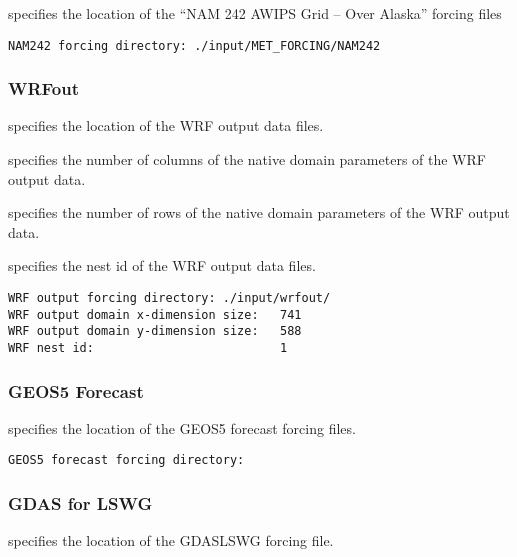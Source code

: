  
  specifies the location of the
 ``NAM 242 AWIPS Grid -- Over Alaska'' forcing files
 

 \begin{Verbatim}[frame=single]
NAM242 forcing directory: ./input/MET_FORCING/NAM242
 \end{Verbatim}

 
 \subsubsection{WRFout} \label{sssec:supp_wrfout}
 

 
  specifies the location of the
 WRF output data files.

  specifies the number of
 columns of the native domain parameters of the WRF output data.

  specifies the number of
 rows of the native domain parameters of the WRF output data.

  specifies the nest id of the WRF output data files. 
 

 \begin{Verbatim}[frame=single]
WRF output forcing directory: ./input/wrfout/
WRF output domain x-dimension size:   741
WRF output domain y-dimension size:   588
WRF nest id:                          1
 \end{Verbatim}

 
 \subsubsection{GEOS5 Forecast} \label{sssec:geos5forecast}
 

 
  specifies the location
 of the GEOS5 forecast forcing files.
 

 \begin{Verbatim}[frame=single]
GEOS5 forecast forcing directory:
 \end{Verbatim}

 
 \subsubsection{GDAS for LSWG} \label{sssec:gdaslswg}
 

 
  specifies the location of the
 GDASLSWG forcing file.

